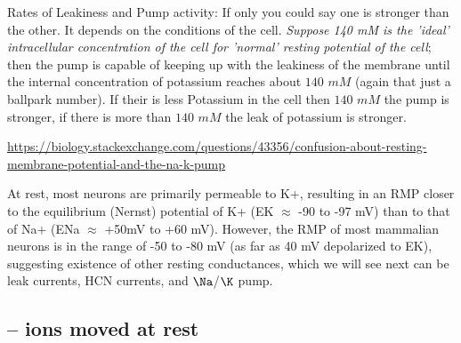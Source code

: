 \begin{enumerate}
  Rates of Leakiness and Pump activity: If only you could say one is stronger
  than the other. It depends on the conditions of the cell.
  {\it Suppose 140 mM is the 'ideal' intracellular concentration of the cell for
  'normal' resting potential of the cell}; then the pump is capable of keeping
  up with the leakiness of the membrane until the internal concentration of
  potassium reaches about $140$ $mM$ (again that just a ballpark number).
  If their is less Potassium in the cell then $140$ $mM$ the pump is stronger,
  if there is more than $140$ $mM$ the leak of potassium is stronger.
  
  \url{https://biology.stackexchange.com/questions/43356/confusion-about-resting-membrane-potential-and-the-na-k-pump}
\end{enumerate}

At rest, most neurons are primarily permeable to K+, resulting in an RMP closer
to the equilibrium (Nernst) potential of K+ (EK $\approx$ -90 to -97 mV) than to
that of Na+ (ENa  $\approx$ +50mV to +60 mV).
However, the RMP of most mammalian neurons is in the range of -50 to -80 mV (as
far as 40 mV depolarized to EK), suggesting existence of other resting
conductances, which we will see next can be leak currents, HCN currents, and
$\Na$/$\K$ pump.

\subsection{-- ions moved at rest}

